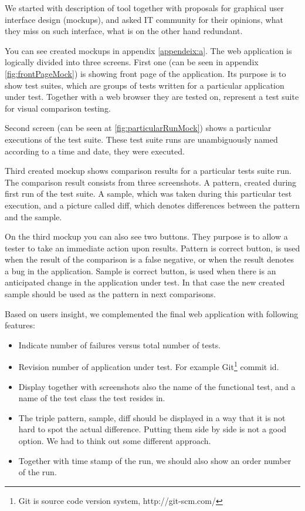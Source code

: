 \documentclass[11pt,oneside,final]{fithesis2}
\begin{document}
  We started with description of tool together with proposals for graphical user interface design (mockups), and asked IT community for their
  opinions, what they miss on such interface, what is on the other hand redundant.
  
  You can see created mockups in appendix \ref{appendeix:a}. The web application is logically divided into
  three screens. First one (can be seen in appendix \ref{fig:frontPageMock}) is showing front page of the application. Its purpose
  is to show test suites, which are groups of tests written for a particular application under test.
  Together with a web browser they are tested on, represent a test suite for visual comparison testing.
  
  Second screen (can be seen at \ref{fig:particularRunMock}) shows a particular executions of the test suite. These test
  suite runs are unambiguously named according to a time and date, they were executed.
  
  Third created mockup shows comparison results for a particular tests suite run. The comparison result
  consists from three screenshots. A pattern, created during first run of the test suite. A sample, which
  was taken during this particular test execution, and a picture called diff, which denotes differences
  between the pattern and the sample.
  
  On the third mockup you can also see two buttons. They purpose is to allow a tester to take an immediate
  action upon results. Pattern is correct button, is used when the result of the comparison is
  a false negative, or when the result denotes a bug in the application. Sample is correct button, is used
  when there is an anticipated change in the application under test. 
  In that case the new created sample should be used as the pattern in next comparisons.
  
  Based on users insight, we complemented the final web application with following features:
  
  \begin{itemize}
   \item Indicate number of failures versus total number of tests.
   \item Revision number of application under test. For example Git\footnote{Git is source code version system, http://git-scm.com/}
   commit id.
   \item Display together with screenshots also the name of the functional test, and a name of the test class
   the test resides in.
   \item The triple pattern, sample, diff should be displayed in a way that it is not hard to spot the
   actual difference. Putting them side by side is not a good option. We had to think out some different
   approach.
   \item Together with time stamp of the run, we should also show an order number of the run.
  \end{itemize}
\end{document}
